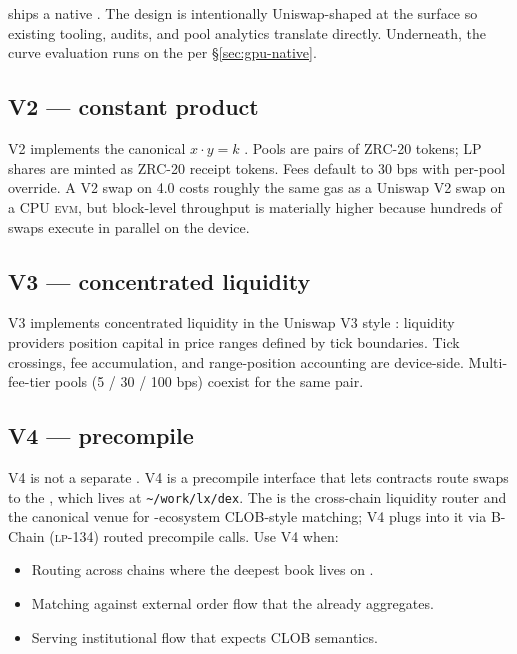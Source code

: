 \section{\Zoo{} \DEX{}}
\label{sec:zoo-dex}

\Zoo{} ships a native \AMM{} \DEX{}. The design is intentionally
Uniswap-shaped at the surface so existing tooling, audits, and pool
analytics translate directly. Underneath, the curve evaluation runs on
the \GPU{} per \S\ref{sec:gpu-native}.

\subsection{V2 --- constant product}

V2 implements the canonical $x \cdot y = k$ \AMM{}. Pools are pairs of
ZRC-20 tokens; LP shares are minted as ZRC-20 receipt tokens. Fees default
to 30 bps with per-pool override. A V2 swap on \Zoo{} 4.0 costs roughly
the same gas as a Uniswap V2 swap on a CPU \textsc{evm}, but block-level
throughput is materially higher because hundreds of swaps execute in
parallel on the device.

\subsection{V3 --- concentrated liquidity}

V3 implements concentrated liquidity in the Uniswap V3 style
\cite{uniswap-v3}: liquidity providers position capital in price ranges
defined by tick boundaries. Tick crossings, fee accumulation, and
range-position accounting are device-side. Multi-fee-tier pools
(5 / 30 / 100 bps) coexist for the same pair.

\subsection{V4 --- \Lux{} \DEX{} precompile}

V4 is not a separate \AMM{}. V4 is a precompile interface that lets
\Zoo{} contracts route swaps to the \Lux{} \DEX{} \cite{lux-dex},
which lives at \texttt{\textasciitilde/work/lx/dex}. The \Lux{} \DEX{}
is the cross-chain liquidity router and the canonical venue for
\Lux{}-ecosystem CLOB-style matching; \Zoo{} V4 plugs into it via
B-Chain (\textsc{lp-134}) routed precompile calls. Use V4 when:

\begin{itemize}[leftmargin=1.2em]
  \item Routing across chains where the deepest book lives on \Lux{}.
  \item Matching against external order flow that the \Lux{} \DEX{}
        already aggregates.
  \item Serving institutional flow that expects CLOB semantics.
\end{itemize}

